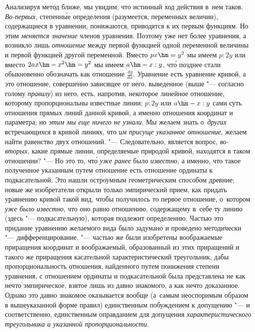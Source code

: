 Анализируя метод ближе, мы увидим, что истинный ход действия в~нем таков.
{\em Во-первых}, степенн\'{ы}е определения (разумеется, переменных величин),
содержащиеся в уравнении, понижаются, приводятся к их первым функциям. Но этим
{\em меняется значение} членов уравнения. Поэтому уже нет более уравнения,
а возникло лишь {\em отношение} между первой функцией одной переменной величины
и первой функцией другой переменной. Вместо $px\hm=y^2$ мы имеем $p:2y$ или
вместо $2ax\hm-x^2\hm=y^2$ мы имеем $a\hm-x:y$, чт\'{о} позднее стали
обыкновенно обозначать как отношение $\frac{dy}{dx}$. Уравнение есть уравнение
кривой, а это отношение, совершенно зависящее от него, выведенное (выше "---
согласно голому {\em правилу}) из него, есть, напротив, некоторое линейное
отношение, которому пропорциональны известные линии; $p:2y$ или $a\hm-x:y$ сами
суть отношения прямых линий данной кривой, а именно отношения координат и
параметра; но {\em этим мы еще ничего не узнали}. Мы желаем знать
о~{\em других} встречающихся в кривой линиях, что {\em им присуще указанное
отношение}, желаем найти равенство двух отношений. "--- Следовательно, является
вопрос, {\em во-вторых}, какие прямые линии, определяемые природой кривой,
находятся в таком отношении? "--- Но это то, чт\'{о} {\em уже ранее} было
{\em известно}, а именно, что такое полученное указанным путем отношение есть
отношение ординаты к подкасательной. Это нашли остроумным геометрическим
способом древние; новые же изобретатели открыли только эмпирический прием, как
придать уравнению кривой такой вид, чтобы получилось то первое отношение,
о~котором {\em уже было известно}, что оно равно отношению, содержащему в~себе
ту линию (здесь "--- подкасательную), которая подлежит определению. Частью это
придание уравнению желаемого вида было задумано и проведено методически
"--- дифференцирование, "--- частью же были изобретены воображаемые
приращения координат и воображаемый, образованный из этих приращений и
такого же приращения касательной характеристический треугольник, дабы
пропорциональность отношения, найденного путем понижения степени уравнения,
с отношением ординаты и подкасательной была представлена не как нечто
эмпирическое, взятое лишь из давно знакомого, а как нечто доказанное.
Однако это давно знакомое оказывается вообще (а~самым неоспоримым образом в
вышеуказанной форме правил) единственным побуждением к допущению "--- и
соответственно, единственным оправданием для допущения
{\em характеристического треугольника и указанной пропорциональности}.

